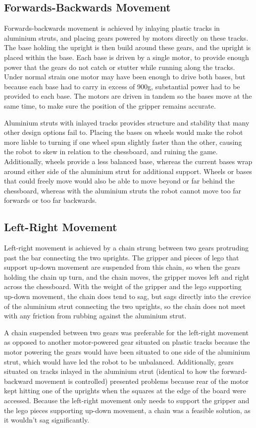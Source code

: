 \documentclass[onecolumn]{IEEEtran}
\begin{document}
\subsection{Forwards-Backwards Movement}
Forwards-backwards movement is achieved by inlaying plastic tracks in aluminium struts, and placing gears powered by motors directly on these tracks. The base holding the upright is then build around these gears, and the upright is placed within the base. Each base is driven by a single motor, to provide enough power that the gears do not catch or stutter while running along the tracks. Under normal strain one motor may have been enough to drive both bases, but because each base had to carry in excess of 900g, substantial power had to be provided to each base. The motors are driven in tandem so the bases move at the same time, to make sure the position of the gripper remains accurate. \par
Aluminium struts with inlayed tracks provides structure and stability that many other design options fail to. Placing the bases on wheels would make the robot more liable to turning if one wheel spun slightly faster than the other, causing the robot to skew in relation to the chessboard, and ruining the game. Additionally, wheels provide a less balanced base, whereas the current bases wrap around either side of the aluminium strut for additional support. Wheels or bases that could freely move would also be able to move beyond or far behind the chessboard, whereas with the aluminium struts the robot cannot move too far forwards or too far backwards. \par
\subsection{Left-Right Movement}
Left-right movement is achieved by a chain strung between two gears protruding past the bar connecting the two uprights. The gripper and pieces of lego that support up-down movement are suspended from this chain, so when the gears holding the chain up turn, and the chain moves, the gripper moves left and right across the chessboard. With the weight of the gripper and the lego supporting up-down movement, the chain does tend to sag, but sags directly into the crevice of the aluminium strut connecting the two uprights, so the chain does not meet with any friction from rubbing against the aluminium strut.\par
A chain suspended between two gears was preferable for the left-right movement as opposed to another motor-powered gear situated on plastic tracks because the motor powering the gears would have been situated to one side of the aluminium strut, which would have led the robot to be unbalanced. Additionally, gears situated on tracks inlayed in the aluminium strut (identical to how the forward-backward movement is controlled) presented problems because rear of the motor kept hitting one of the uprights when the squares at the edge of the board were accessed. Because the left-right movement only needs to support the gripper and the lego pieces supporting up-down movement, a chain was a feasible solution, as it wouldn't sag significantly. \par
\end{document}
